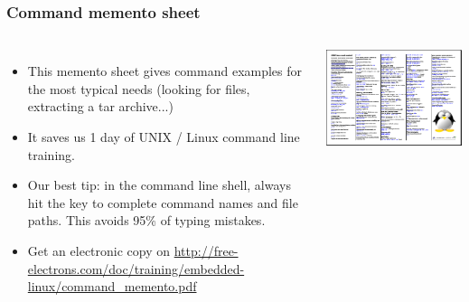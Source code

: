 \begin{frame}
  \frametitle{Command memento sheet}
  \begin{columns}
    \begin{itemize}
       \item This memento sheet gives command examples for the most
       typical needs (looking for files, extracting a tar archive...)
       \item It saves us 1 day of UNIX / Linux command line training.
       \item Our best tip: in the command line shell, always hit the
        key to complete command names and file paths.
       This avoids 95\% of typing mistakes.
       \item Get an electronic copy on
       \url{http://free-electrons.com/doc/training/embedded-linux/command_memento.pdf}
    \end{itemize}
    \includegraphics[width=\textwidth]{slides/course-information/command_memento.png}
  \end{columns}
\end{frame}

